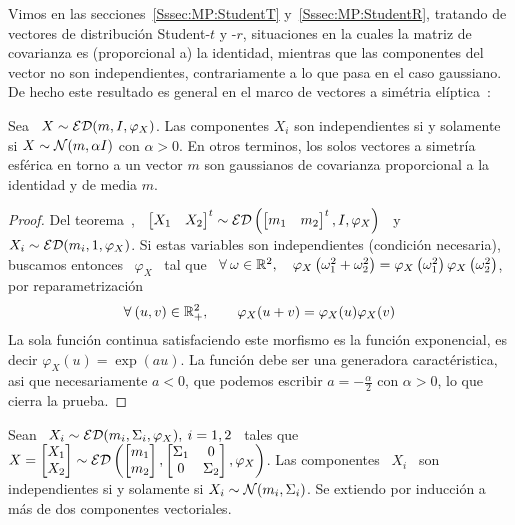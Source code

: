 Vimos   en   las  secciones~\ref{Sssec:MP:StudentT}   y~\ref{Sssec:MP:StudentR},
tratando de  vectores de  distribuci\'on Student-$t$ y  -$r$, situaciones  en la
cuales la  matriz de covarianza es  (proporcional a) la  identidad, mientras que
las componentes del  vector no son independientes, contrariamente  a lo que pasa
en  el caso  gaussiano.   De hecho  este resultado  es  general en  el marco  de
vectores a sim\'etria el\'iptica~\cite{BilBre99, Max67}:
%
\begin{teorema}
\label{Teo:MP:MaxwellHershell}
%
  Sea \ $X \sim \mathcal{ED}(m,I,\varphi_X)$. Las componentes $X_i$ son independientes si
  y solamente si $X  \sim \mathcal{N}(m, \alpha I)$ con $\alpha >  0$. En otros terminos,
  los  solos vectores  a simetr\'ia  esf\'erica  en torno  a un  vector $m$  son
  gaussianos de covarianza proporcional a la identidad y de media $m$.
\end{teorema}
%
\begin{proof}
  Del teorema~\cite{Teo:MP:TranformacionAfinEliptica},  \ $\begin{bmatrix} X_1 &
    X_2    \end{bmatrix}^t     \sim    \mathcal{ED}\left(    \begin{bmatrix}     m_1    &
      m_2 \end{bmatrix}^t, I, \varphi_X \right)$ \ y  \ $X_i \sim \mathcal{ED}( m_i , 1 ,
  \varphi_X)$.  Si  estas variables son  independientes (condici\'on necesaria),
  buscamos entonces  \ $\varphi_X$ \ tal  que \ $\forall \:  \omega \in \mathbb{R}^2,
  \quad  \varphi_X\left(  \omega_1^2  +  \omega_2^2  \right)  =  \varphi_X\left(
    \omega_1^2   \right)   \varphi_X\left(    \omega_2^2   \right)$,   \ie   por
  reparametrizaci\'on
  \[
  \forall  \:   (u,v)  \in  \mathbb{R}_+^2,  \qquad   \varphi_X(u+v)  =  \varphi_X(u)
  \varphi_X(v)
  \]
  La  sola  funci\'on  continua  satisfaciendo  este morfismo  es  la  funci\'on
  exponencial, es decir  $\varphi_X(u) = \exp(a u)$.  La  funci\'on debe ser una
  generadora  caract\'eristica, asi  que  necesariamente $a  <  0$, que  podemos
  escribir $a = - \frac{\alpha}{2}$ con $\alpha > 0$, lo que cierra la prueba.
\end{proof}
%
\begin{corolario}%
\label{Cor:MP:MaxwellHershell}
%
Sean \ $X_i \sim \mathcal{ED}( m_i , \Sigma_i , \varphi_X), \: i = 1, 2$ \ tales que \ $X
=  \begin{bmatrix} X_1\\X_2 \end{bmatrix}  \sim \mathcal{ED}\left(  \begin{bmatrix} m_1\\
    m_2   \end{bmatrix}    ,   \begin{bmatrix}   \Sigma_1    &   0   \\    0   &
    \Sigma_2 \end{bmatrix} , \varphi_X \right)$.   Las componentes \ $X_i$ \ son
independientes si y solamente si $X_i  \sim \mathcal{N}(m_i , \Sigma_i)$. Se extiendo por
inducci\'on a m\'as de dos componentes vectoriales.
\end{corolario}
